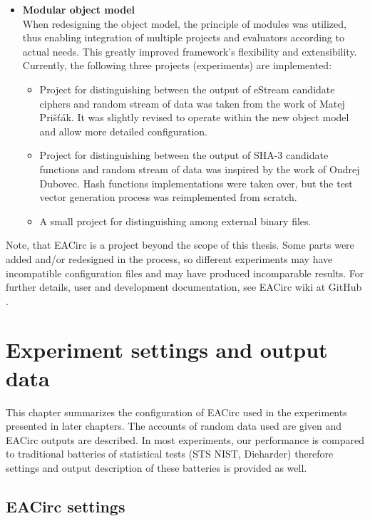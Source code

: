 \documentclass[12pt,oneside]{fithesis2}
\begin{document}
\begin{itemize}
\item \textbf{Modular object model}\\
When redesigning the object model, the principle of modules was utilized, thus enabling integration of multiple projects 
and evaluators according to actual needs. This greatly improved framework's flexibility and extensibility.
Currently, the following three projects (experiments) are implemented:
\begin{itemize}
\item Project for distinguishing between the output of eStream candidate ciphers and random stream of data was taken from the work of 
Matej Prišťák.
It was slightly revised to operate within the new object model and allow more detailed configuration.
\item Project for distinguishing between the output of SHA-3 candidate functions and random stream of data was inspired by the work of 
Ondrej Dubovec.
Hash functions implementations were taken over, but the test vector generation process was reimplemented from scratch. 
\item A small project for distinguishing among external binary files.
\end{itemize}
\end{itemize}

\noindent
Note, that EACirc is a project beyond the scope of this thesis. Some parts were added and/or redesigned in the process, so
different experiments may have incompatible configuration files and may have produced incomparable results.
For further details, user and development documentation, see EACirc wiki at GitHub \parencite{eacirc-github}.	

\chapter{Experiment settings and output data}
\label{chap:settings}

This chapter summarizes the configuration of EACirc used in the experiments presented in later chapters.
The accounts of random data used are given and EACirc outputs are described. 
In most experiments, our performance is compared to traditional batteries of statistical tests (STS NIST, Dieharder)
therefore settings and output description of these batteries is provided as well.

\section{EACirc settings}
\label{sec:settings-eacirc}
\end{document}
